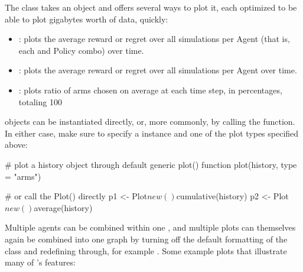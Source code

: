 \documentclass{jss}
\begin{document}
The  class takes an  object and offers several ways to plot it, each optimized to be able to plot gigabytes worth of data, quickly:

\begin{itemize}
         \item {}: plots the average reward or regret over all simulations per Agent (that is, each  and Policy combo) over time.
         \item {}: plots the average reward or regret over all simulations per Agent over time.
         \item {}: plots ratio of arms chosen on average at each time step, in percentages, totaling 100%

\end{itemize}

 objects can be instantiated directly, or, more commonly, by calling the  function. In either case, make sure to specify a  instance and one of the plot types specified above:

\begin{Code}
# plot a history object through default generic plot() function
plot(history, type = "arms")

# or call the Plot() directly
p1 <- Plot$new()$cumulative(history)
p2 <- Plot$new()$average(history)
\end{Code}

Multiple agents can be combined within one , and multiple plots can themselves again be combined into one graph by turning off the default  formatting of the  class and redefining  through, for example . Some example plots that illustrate many of 's features:
\end{document}
